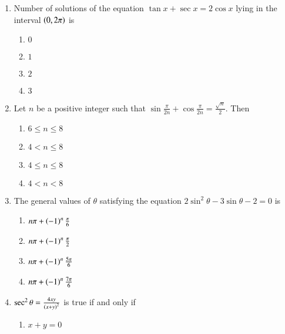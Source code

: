 \begin{enumerate}[label=\thesubsection.\arabic*,ref=\thesubsection.\theenumi]
    \item Number of solutions of the equation $\tan{x}+\sec{x} = 2\cos{x}$ lying in the interval $\left(0, 2\pi\right)$ is
        \hfill{}
        \begin{multicols}{4}
\begin{enumerate}
                \item $0$
                \item $1$
                \item $2$
                \item $3$
        \end{enumerate}
\end{multicols}
    \item Let $n$ be a positive integer such that $\sin{\frac{\pi}{2n}} + \cos{\frac{\pi}{2n}} = \frac{\sqrt{n}}{2}$. Then
        \hfill{}
        \begin{multicols}{4}
\begin{enumerate}
                \item $6\le n\le8$
                \item $4<n\le8$
                \item $4\le n\le8$  
                \item $4<n<8$
        \end{enumerate}
\end{multicols}
    \item The general values of $\theta$ satisfying the equation $2\sin^2{\theta}-3\sin{\theta}-2=0$ is
        \hfill{}
        \begin{multicols}{4}
\begin{enumerate}
                \item $n\pi + \left(-1\right)^n\frac{\pi}{6}$
                \item $n\pi + \left(-1\right)^n\frac{\pi}{2}$
                \item $n\pi + \left(-1\right)^n\frac{5\pi}{6}$ 
                \item $n\pi + \left(-1\right)^n\frac{7\pi}{6}$
        \end{enumerate}
\end{multicols}
    \item $\sec^2{\theta} = \frac{4xy}{\left(x+y\right)^2}$ is true if and only if
        \hfill{}
        \begin{multicols}{4}
\begin{enumerate}
                \item $x+y=0$

\end{enumerate}
\end{multicols}
\end{enumerate}
